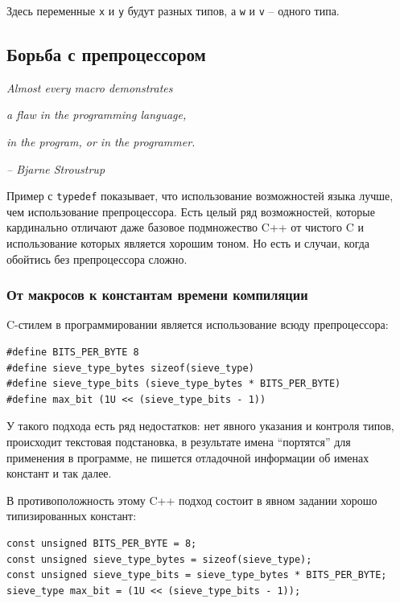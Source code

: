 \documentclass[a4paper,12pt,oneside]{article}
\begin{document}
Здесь переменные \lstinline!x! и \lstinline!y! будут разных типов, а \lstinline!w! и \lstinline!v! – одного типа.

\pagebreak
\subsection{Борьба с препроцессором}

\hfill\textit{Almost every macro demonstrates}

\hfill\textit{a flaw in the programming language,}

\hfill\textit{in the program, or in the programmer.}{\vspace{0.5em}}

\hfill\textit{-- Bjarne Stroustrup}

Пример с \lstinline!typedef! показывает, что использование возможностей языка лучше, чем использование препроцессора. Есть целый ряд возможностей, которые кардинально отличают даже базовое подмножество C++ от чистого C и использование которых является хорошим тоном. Но есть и случаи, когда обойтись без препроцессора сложно.

\subsubsection{От макросов к константам времени компиляции}\label{ConstVsDef}

C-стилем в программировании является использование всюду препроцессора:

\begin{lstlisting}
#define BITS_PER_BYTE 8
#define sieve_type_bytes sizeof(sieve_type)
#define sieve_type_bits (sieve_type_bytes * BITS_PER_BYTE)
#define max_bit (1U << (sieve_type_bits - 1))
\end{lstlisting}

У такого подхода есть ряд недостатков: нет явного указания и контроля типов, происходит текстовая подстановка, в результате имена ``портятся'' для применения в программе, не пишется отладочной информации об именах констант и так далее.

В противоположность этому C++ подход состоит в явном задании хорошо типизированных констант:

\begin{lstlisting}
const unsigned BITS_PER_BYTE = 8;
const unsigned sieve_type_bytes = sizeof(sieve_type);
const unsigned sieve_type_bits = sieve_type_bytes * BITS_PER_BYTE;
sieve_type max_bit = (1U << (sieve_type_bits - 1));
\end{lstlisting}
\end{document}

